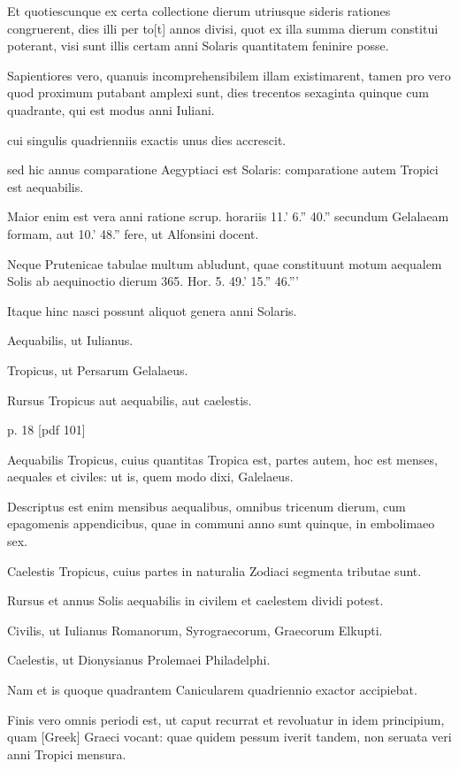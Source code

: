Et quotiescunque ex certa collectione
dierum utriusque sideris rationes congruerent, dies illi per to[t]
annos divisi, quot ex illa summa dierum constitui poterant, visi sunt
illis certam anni Solaris quantitatem feninire posse.

Sapientiores vero,
quanuis incomprehensibilem illam existimarent, tamen pro vero quod
proximum putabant amplexi sunt, dies trecentos sexaginta quinque
cum quadrante, qui est modus anni Iuliani.

cui singulis quadrienniis
exactis unus dies accrescit.

sed hic annus comparatione Aegyptiaci
est Solaris: comparatione autem Tropici est aequabilis.

Maior
enim est vera anni ratione scrup. horariis 11.' 6.'' 40.'' secundum
Gelalaeam formam, aut 10.' 48.'' fere, ut Alfonsini docent.

Neque
Prutenicae tabulae multum abludunt, quae constituunt motum
aequalem Solis ab aequinoctio dierum 365. Hor. 5. 49.' 15.'' 46.'''

Itaque hinc nasci possunt aliquot genera anni Solaris.

Aequabilis,
ut Iulianus.

Tropicus, ut Persarum Gelalaeus.

Rursus Tropicus
aut aequabilis, aut caelestis.


p. 18 [pdf 101]

Aequabilis
Tropicus, cuius quantitas
Tropica est, partes autem, hoc est menses, aequales et civiles: ut is,
quem modo dixi, Galelaeus.

Descriptus est enim mensibus aequalibus,
omnibus tricenum dierum, cum epagomenis appendicibus, quae
in communi anno sunt quinque, in embolimaeo sex.

Caelestis Tropicus,
cuius partes in naturalia Zodiaci segmenta tributae sunt.

Rursus
et annus Solis aequabilis in civilem et caelestem dividi potest.

Civilis,
ut Iulianus Romanorum, Syrograecorum, Graecorum Elkupti.

Caelestis,
ut Dionysianus Prolemaei Philadelphi.

Nam et is quoque quadrantem
Canicularem quadriennio exactor accipiebat.

Finis vero
omnis periodi est, ut caput recurrat et revoluatur in idem principium,
quam \textgreek{[Greek]} Graeci vocant: quae quidem pessum iverit tandem,
non seruata veri anni Tropici mensura.

